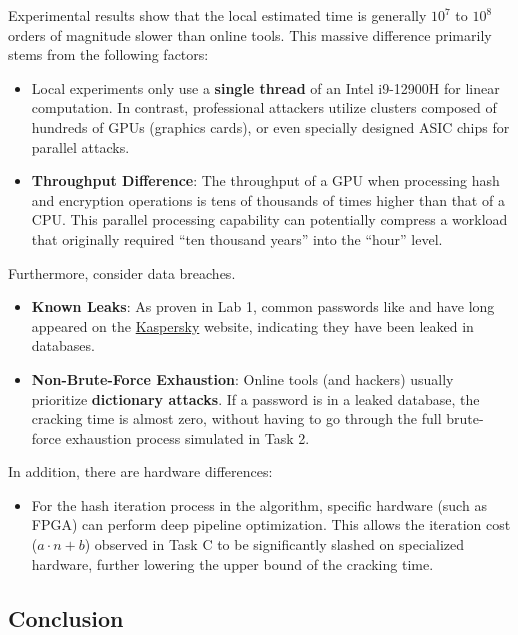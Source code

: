 \documentclass[12pt,a4paper]{article}
\begin{document}
Experimental results show that the local estimated time is generally $10^7$ to $10^8$ orders of magnitude slower than online tools. This massive difference primarily stems from the following factors:

\begin{itemize}
    \item Local experiments only use a \textbf{single thread} of an Intel i9-12900H for linear computation. In contrast, professional attackers utilize clusters composed of hundreds of GPUs (graphics cards), or even specially designed ASIC chips for parallel attacks.
    \item \textbf{Throughput Difference}: The throughput of a GPU when processing hash and encryption operations is tens of thousands of times higher than that of a CPU. This parallel processing capability can potentially compress a workload that originally required ``ten thousand years'' into the ``hour'' level.
\end{itemize}

Furthermore, consider data breaches.

\begin{itemize}
    \item \textbf{Known Leaks}: As proven in Lab 1, common passwords like  and  have long appeared on the \href{https://password.kaspersky.com}{Kaspersky} website, indicating they have been leaked in databases.
    \item \textbf{Non-Brute-Force Exhaustion}: Online tools (and hackers) usually prioritize \textbf{dictionary attacks}. If a password is in a leaked database, the cracking time is almost zero, without having to go through the full brute-force exhaustion process simulated in Task 2.
\end{itemize}

In addition, there are hardware differences:

\begin{itemize}
    \item For the hash iteration process in the  algorithm, specific hardware (such as FPGA) can perform deep pipeline optimization. This allows the iteration cost ($a \cdot n + b$) observed in Task C to be significantly slashed on specialized hardware, further lowering the upper bound of the cracking time.
\end{itemize}

\subsection{Conclusion}
\end{document}
